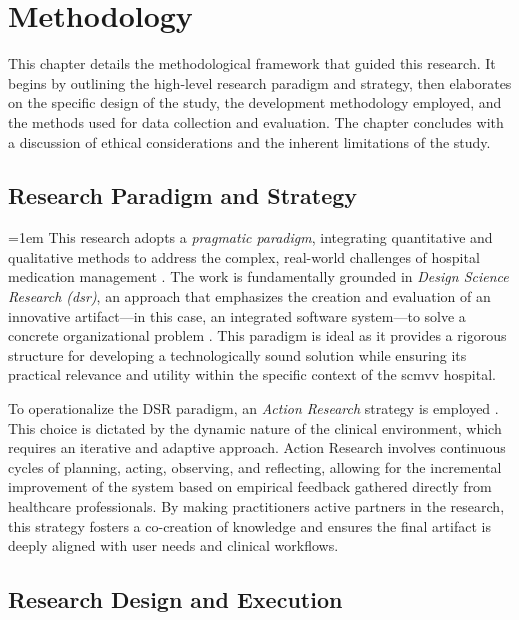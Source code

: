 \chapter{Methodology}
\label{chap:Methodology}

This chapter details the methodological framework that guided this research. It begins by outlining the high-level research paradigm and strategy, then elaborates on the specific design of the study, the development methodology employed, and the methods used for data collection and evaluation. The chapter concludes with a discussion of ethical considerations and the inherent limitations of the study.

\section{Research Paradigm and Strategy}

\begingroup
\emergencystretch=1em
This research adopts a \textit{pragmatic paradigm}, integrating quantitative and qualitative methods to address the complex, real-world challenges of hospital medication management \cite{venkatesh2003}. The work is fundamentally grounded in \textit{Design Science Research (\gls{dsr})}, an approach that emphasizes the creation and evaluation of an innovative artifact\mbox{—}in this case, an integrated software system\mbox{—}to solve a concrete organizational problem \cite{martin2017}. This paradigm is ideal as it provides a rigorous structure for developing a technologically sound solution while ensuring its practical relevance and utility within the specific context of the \gls{scmvv} hospital.

To operationalize the DSR paradigm, an \textit{Action Research} strategy is employed \cite{greenhalgh2017}. This choice is dictated by the dynamic nature of the clinical environment, which requires an iterative and adaptive approach. Action Research involves continuous cycles of planning, acting, observing, and reflecting, allowing for the incremental improvement of the system based on empirical feedback gathered directly from healthcare professionals. By making practitioners active partners in the research, this strategy fosters a co-creation of knowledge and ensures the final artifact is deeply aligned with user needs and clinical workflows.
\endgroup

\section{Research Design and Execution}

